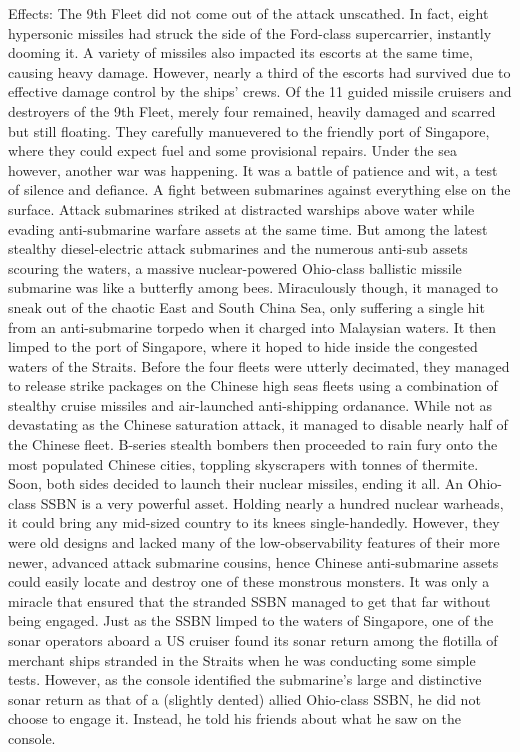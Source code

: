         Effects:
            The 9th Fleet did not come out of the attack unscathed. In fact, eight hypersonic missiles had struck the side of the Ford-class supercarrier, instantly dooming it. A variety of missiles also impacted its escorts at the same time, causing heavy damage. However, nearly a third of the escorts had survived due to effective damage control by the ships' crews.
            Of the 11 guided missile cruisers and destroyers of the 9th Fleet, merely four remained, heavily damaged and scarred but still floating. They carefully manuevered to the friendly port of Singapore, where they could expect fuel and some provisional repairs.
            Under the sea however, another war was happening. It was a battle of patience and wit, a test of silence and defiance. A fight between submarines against everything else on the surface. Attack submarines striked at distracted warships above water while evading anti-submarine warfare assets at the same time. But among the latest stealthy diesel-electric attack submarines and the numerous anti-sub assets scouring the waters, a massive nuclear-powered Ohio-class ballistic missile submarine was like a butterfly among bees.
            Miraculously though, it managed to sneak out of the chaotic East and South China Sea, only suffering a single hit from an anti-submarine torpedo when it charged into Malaysian waters. It then limped to the port of Singapore, where it hoped to hide inside the congested waters of the Straits.
            Before the four fleets were utterly decimated, they managed to release strike packages on the Chinese high seas fleets using a combination of stealthy cruise missiles and air-launched anti-shipping ordanance. While not as devastating as the Chinese saturation attack, it managed to disable nearly half of the Chinese fleet. B-series stealth bombers then proceeded to rain fury onto the most populated Chinese cities, toppling skyscrapers with tonnes of thermite. Soon, both sides decided to launch their nuclear missiles, ending it all.
            An Ohio-class SSBN is a very powerful asset. Holding nearly a hundred nuclear warheads, it could bring any mid-sized country to its knees single-handedly. However, they were old designs and lacked many of the low-observability features of their more newer, advanced attack submarine cousins, hence Chinese anti-submarine assets could easily locate and destroy one of these monstrous monsters. It was only a miracle that ensured that the stranded SSBN managed to get that far without being engaged.
            Just as the SSBN limped to the waters of Singapore, one of the sonar operators aboard a US cruiser found its sonar return among the flotilla of merchant ships stranded in the Straits when he was conducting some simple tests. However, as the console identified the submarine's large and distinctive sonar return as that of a (slightly dented) allied Ohio-class SSBN, he did not choose to engage it. Instead, he told his friends about what he saw on the console.
